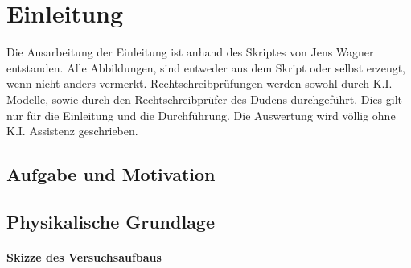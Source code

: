 \chapter{Einleitung} \label{ch:Einleitung}

Die Ausarbeitung der Einleitung ist anhand des Skriptes von Jens Wagner entstanden. Alle Abbildungen, sind entweder aus dem Skript oder selbst erzeugt, wenn nicht anders vermerkt. Rechtschreibprüfungen werden sowohl durch K.I.-Modelle, sowie durch den Rechtschreibprüfer des Dudens durchgeführt.  Dies gilt nur für die Einleitung und die Durchführung. Die Auswertung wird völlig ohne K.I. Assistenz geschrieben. \cite{skriptPAP21, Duden}

\cite{githubPAP2}


\section{Aufgabe und Motivation}
\label{sec:AuM}

\bspTab



\section{Physikalische Grundlage}
\label{sec:PhyBasics}


\subsubsection*{Skizze des Versuchsaufbaus}
\label{sec:Skizze}

